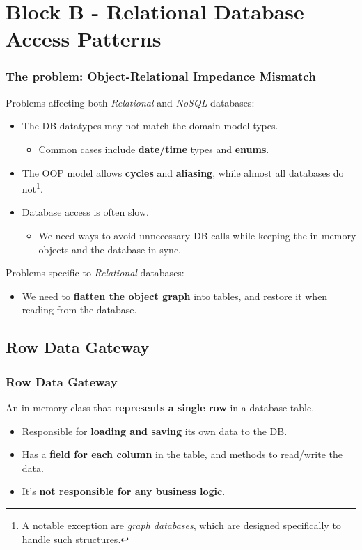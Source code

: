 \documentclass{beamer}
\begin{document}
\section{Block B - Relational Database Access Patterns}

\begin{frame}
  \frametitle{The problem: Object-Relational Impedance Mismatch}

  Problems affecting both \textit{Relational} and \textit{NoSQL} databases:

  \begin{itemize}
    \item The DB datatypes may not match the domain model types.
    \begin{itemize}
      \item Common cases include \textbf{date/time} types and \textbf{enums}.
    \end{itemize}
    \item The OOP model allows \textbf{cycles} and \textbf{aliasing}, while almost all databases do not\footnote{A notable exception are \textit{graph databases}, which are designed specifically to handle such structures.}.
    \item Database access is often slow.
    \begin{itemize}
      \item We need ways to avoid unnecessary DB calls while keeping the in-memory objects and the database in sync.
    \end{itemize}
  \end{itemize}

  Problems specific to \textit{Relational} databases:
  \begin{itemize}
    \item We need to \textbf{flatten the object graph} into tables, and restore it when reading from the database.
  \end{itemize}
\end{frame}

\subsection{Row Data Gateway}
\begin{frame}
  \frametitle{Row Data Gateway}

  An in-memory class that \textbf{represents a single row} in a database table.

  \begin{itemize}
    \item Responsible for \textbf{loading and saving} its own data to the DB.
    \item Has a \textbf{field for each column} in the table, and methods to read/write the data.
    \item It's \textbf{not responsible for any business logic}.
  \end{itemize}

\end{frame}
\end{document}
